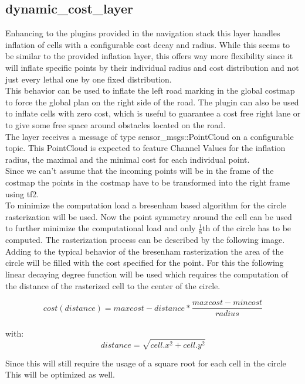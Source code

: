 \subsection{dynamic\_cost\_layer}
Enhancing to the plugins provided in the navigation stack this layer handles inflation of cells with a configurable cost decay and radius. While this seems to be similar to the provided inflation layer, this offers way more flexibility since it will inflate specific points by their individual radius and cost distribution and not just every lethal one by one fixed distribution.\\

This behavior can be used to inflate the left road marking in the global costmap to force the global plan on the right side of the road. The plugin can also be used to inflate cells with zero cost, which is useful to guarantee a cost free right lane or to give some free space around obstacles located on the road.\\

The layer receives a message of type sensor\_msgs::PointCloud on a configurable topic. This PointCloud is expected to feature Channel Values for the inflation radius, the maximal and the minimal cost for each individual point.\\

Since we can't assume that the incoming points will be in the frame of the costmap the points in the costmap have to be transformed into the right frame using tf2.\\

To minimize the computation load a bresenham based algorithm for the circle rasterization will be used. Now the point symmetry around the cell can be used to further minimize the computational load and only $\frac{1}{8}$th of the circle has to be computed. The rasterization process can be described by the following image.\\

Adding to the typical behavior of the bresenham rasterization the area of the circle will be filled with the cost specified for the point. For this the following linear decaying  degree function will be used which requires the computation of the distance of the rasterized cell to the center of the circle.

\[cost(distance)=maxcost-distance*\frac{maxcost-mincost}{radius}\]\\
with: \[distance=\sqrt{cell.x^2+cell.y^2}\]

 Since this will still require the usage of a square root for each cell in the circle This will be optimized as well.\\

